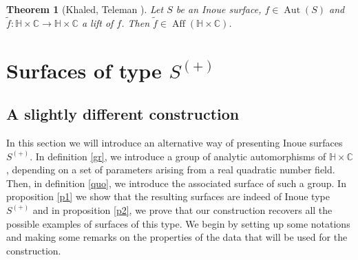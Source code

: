 \documentclass[12pt]{amsart}
\newtheorem{theorem}{Theorem}[section]
\newcommand{\C}{\mathbb{C}}
\newcommand{\HH}{\mathbb{H}}
\DeclareMathOperator{\Aut}{Aut}
\DeclareMathOperator{\Aff}{Aff}
\begin{document}
\begin{theorem}[Khaled, Teleman \cite{KT}] \label{af}
Let $S$ be an Inoue surface, $f \in \Aut(S)$ and $\tilde{f}:\HH\times\C \to \HH\times\C$ a lift of $f$. Then $\tilde{f} \in \Aff(\HH \times \C)$.
\end{theorem}


\section{Surfaces of type $S^{(+)}$}
\subsection{A slightly different construction} \label{const}
In this section we will introduce an alternative way of presenting Inoue surfaces $S^{(+)}$. In definition \ref{gr}, we introduce a group of analytic automorphisms of $\HH \times \C$, depending on a set of parameters arising from a real quadratic number field. Then, in definition \ref{quo}, we introduce the associated surface of such a group. In proposition \ref{p1} we show that the resulting surfaces are indeed of Inoue type $S^{(+)}$ and in proposition \ref{p2}, we prove that our construction recovers all the possible examples of surfaces of this type. We begin by setting up some notations and making some remarks on the properties of the data that will be used for the construction.\par
\end{document}
